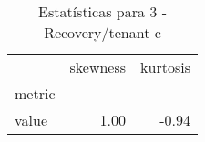 \begin{table}[htbp]
\caption{Estatísticas para 3 - Recovery/tenant-c}
\label{tab:3_-_recovery_tenant-c_skewkurt}
\begin{tabular}{lrr}
\toprule
 & skewness & kurtosis \\
metric &  &  \\
\midrule
value & 1.00 & -0.94 \\
\bottomrule
\end{tabular}
\end{table}
